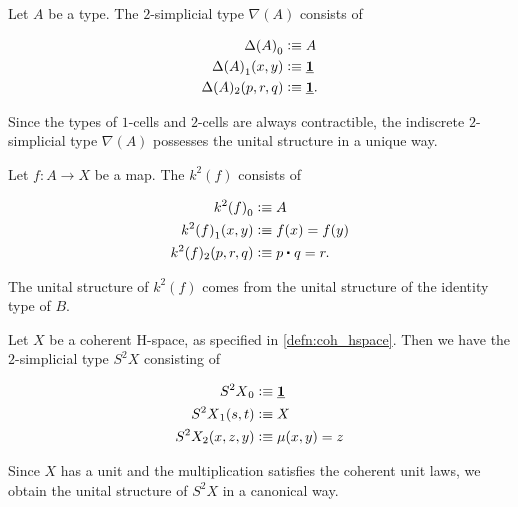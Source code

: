 \begin{eg}
Let $A$ be a type. The  $2$-simplicial type $\nabla(A)$ consists of
\begin{samepage}
\begin{align*}
\pts{\Delta(A)} & \defeq A \\
\edg{\Delta(A)}(x,y) & \defeq \unit \\
\Delta(A)_2(p,r,q) & \defeq \unit. \\
\end{align*}
\end{samepage}%
Since the types of $1$-cells and $2$-cells are always contractible, the indiscrete $2$-simplicial type $\nabla(A)$ possesses the unital structure in a unique way. 
\end{eg}

\begin{eg}
Let $f:A\to X$ be a map. The  $k^2(f)$ consists of
\begin{samepage}
\begin{align*}
\pts{k^2(f)} & \defeq A \\
\edg{k^2(f)}(x,y) & \defeq f(x)=f(y) \\
k^2(f)_2(p,r,q) & \defeq \ct{p}{q}=r. \\
\end{align*}
\end{samepage}%
The unital structure of $k^2(f)$ comes from the unital structure of the identity type of $B$.
\end{eg}

\begin{eg}
Let $X$ be a coherent H-space, as specified in \cref{defn:coh_hspace}. Then we have the $2$-simplicial type $S^2X$ consisting of
\begin{samepage}
\begin{align*}
\pts{S^2X} & \defeq \unit \\
\edg{S^2X}(s,t) & \defeq X \\
S^2X_2(x,z,y) & \defeq \mu(x,y)=z \\
\end{align*}
\end{samepage}%
Since $X$ has a unit and the multiplication satisfies the coherent unit laws, we obtain the unital structure of $S^2 X$ in a canonical way.
\end{eg}

